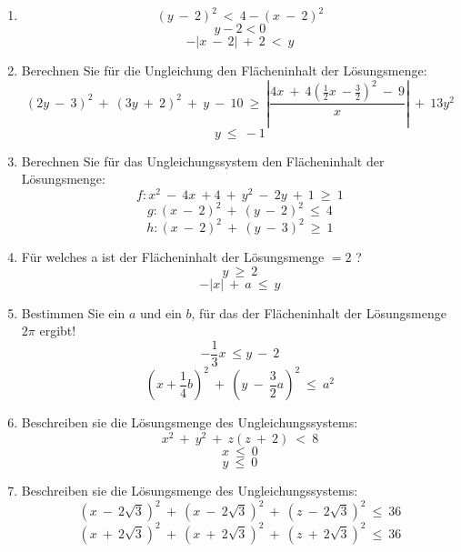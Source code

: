 \begin{enumerate}
\item
\[(y \ - \ 2)^2 \ < \ 4 - (x \ - \ 2)^2\]
\[y -2 < 0\]
\[-|x \ - \ 2| \ + \ 2\ < \ y\]

\item Berechnen Sie für die Ungleichung den Flächeninhalt der Lösungsmenge:
\[ (2y \ - \ 3)^2 \ + \ (3y \ + \ 2)^2 \ + \ y \ - \ 10 \ \geq \ | \frac {4x \ + \ 4 (\frac 1 2 x \ - \frac 3 2 )^2 \ - \ 9} x | \ + \ 13y^2 \]
\[y \ \leq \ -1\]

\item Berechnen Sie für das Ungleichungssystem den Flächeninhalt der Lösungsmenge:
\[f : x^2 \ - \ 4x \ + 4 \ + \ y^2 \ - \ 2y \ + \ 1 \ \geq \ 1 \]
\[g : (x \ - \ 2)^2 \ + \ (y \ - \ 2)^2 \ \leq \ 4 \]
\[h : (x \ - \ 2)^2 \ + \ (y \ - \ 3)^2 \ \geq \ 1 \]

\item
Für welches a ist der Flächeninhalt der Lösungsmenge $ = 2 $ ?
\[y \ \geq \ 2\]
\[-|x| \ + \ a \ \leq \ y\]

\item
Bestimmen Sie ein $a$ und ein $b$, für das der Flächeninhalt der Lösungsmenge $ 2 \pi $ ergibt!
\[- \frac 1 3 x \ \leq y \ - \ 2\]
\[(x+ \frac 1 4 b)^2 \ + \ (y \ - \ \frac 3 2 a)^2 \ \leq \ a^2\]

\item Beschreiben sie die Lösungsmenge des Ungleichungssystems:
\[x^2 \ + \ y^2 \ + \ z (z \ + \ 2) \ < \ 8 \]
\[x \ \leq \ 0 \]
\[y \ \leq \ 0 \]

\item Beschreiben sie die Lösungsmenge des Ungleichungssystems:
\[(x \ - \ 2 \sqrt 3)^2 \ + \ (x \ - \ 2 \sqrt 3)^2 \ + \ (z \ - \ 2 \sqrt 3)^2 \ \leq \ 36\]
\[(x \ + \ 2 \sqrt 3)^2 \ + \ (x \ + \ 2 \sqrt 3)^2 \ + \ (z \ + \ 2 \sqrt 3)^2 \ \leq \ 36\]

\end{enumerate}
